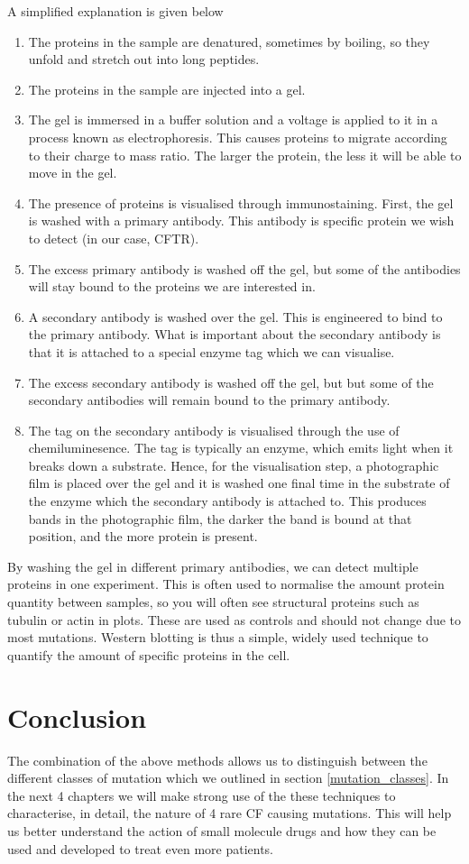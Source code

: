 A simplified explanation is given below
\begin{enumerate}
	\item The proteins in the sample are denatured, sometimes by boiling, so they unfold and stretch out into long peptides. 
	\item The proteins in the sample are injected into a gel.
	\item The gel is immersed in a buffer solution and a voltage is applied to it in a process known as electrophoresis. This causes proteins to migrate according to their charge to mass ratio. The larger the protein, the less it will be able to move in the gel. 
	\item The presence of proteins is visualised through immunostaining. First, the gel is washed with a primary antibody. This antibody is specific protein we wish to detect (in our case, CFTR). 
	\item The excess primary antibody is washed off the gel, but some of the antibodies will stay bound to the proteins we are interested in. 
	\item A secondary antibody is washed over the gel. This is engineered to bind to the primary antibody. What is important about the secondary antibody is that it is attached to a special enzyme tag which we can visualise.  
	\item The excess secondary antibody is washed off the gel, but but some of the secondary antibodies will remain bound to the primary antibody.
	\item The tag on the secondary antibody is visualised through the use of chemiluminesence. The tag is typically an enzyme, which emits light when it breaks down a substrate. Hence, for the visualisation step, a photographic film is placed over the gel and it is washed one final time in the substrate of the enzyme which the secondary antibody is attached to. This produces bands in the photographic film, the darker the band is bound at that position, and the more protein is present.
\end{enumerate}
By washing the gel in different  primary antibodies, we can detect multiple proteins in one experiment. This is often used to normalise the amount protein quantity between samples, so you will often see structural proteins such as tubulin or actin in plots. These are used as controls and should not change due to most mutations. Western blotting is thus a simple, widely used technique to quantify the amount of specific proteins in the cell. 

\section{Conclusion}
The combination of the above methods allows us to distinguish between the different classes of mutation which we outlined in section \ref{mutation_classes}. In the next 4 chapters we will make strong use of the these techniques to characterise, in detail, the nature of 4 rare CF causing mutations. This will help us better understand the action of small molecule drugs and how they can be used and developed to treat even more patients.
